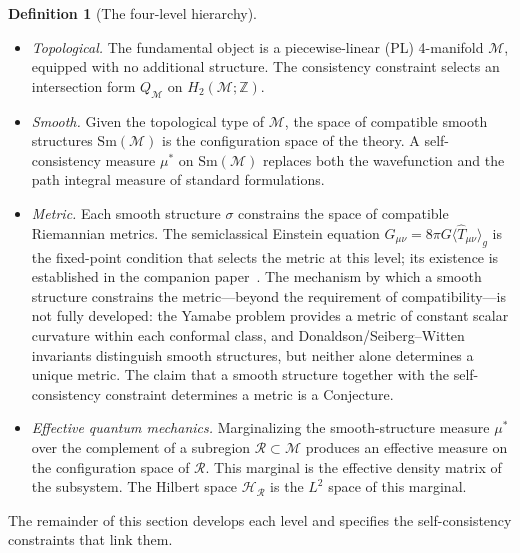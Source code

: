 \documentclass[12pt,a4paper]{article}
\theoremstyle{definition}
\newtheorem{definition}{Definition}
\theoremstyle{remark}
\begin{document}
\begin{definition}[The four-level hierarchy]
\label{def:hierarchy}
\quad
\begin{itemize}
\item[\emph{Level 0.}] \emph{Topological.} The fundamental object is a
piecewise-linear (PL) 4-manifold $\mathcal{M}$, equipped with no additional
structure. The consistency constraint selects an intersection form $Q_\mathcal{M}$
on $H_2(\mathcal{M};\mathbb{Z})$.

\item[\emph{Level 1.}] \emph{Smooth.} Given the topological type of
$\mathcal{M}$, the space of compatible smooth structures $\mathrm{Sm}(\mathcal{M})$
is the configuration space of the theory. A self-consistency measure $\mu^*$ on
$\mathrm{Sm}(\mathcal{M})$ replaces both the wavefunction and the path integral
measure of standard formulations.

\item[\emph{Level 2.}] \emph{Metric.} Each smooth structure $\sigma$ constrains
the space of compatible Riemannian metrics. The semiclassical Einstein equation
$G_{\mu\nu} = 8\pi G\langle\hat{T}_{\mu\nu}\rangle_g$ is the fixed-point
condition that selects the metric at this level; its existence is established in
the companion paper~\cite{fixed_point}. The mechanism by which a smooth
structure constrains the metric---beyond the requirement of compatibility---is
not fully developed: the Yamabe problem provides a metric of constant scalar
curvature within each conformal class, and Donaldson/Seiberg--Witten invariants
distinguish smooth structures, but neither alone determines a unique metric.
The claim that a smooth structure together with the self-consistency constraint
determines a metric is a Conjecture.

\item[\emph{Level 3.}] \emph{Effective quantum mechanics.} Marginalizing the
smooth-structure measure $\mu^*$ over the complement of a subregion
$\mathcal{R}\subset\mathcal{M}$ produces an effective measure on the
configuration space of $\mathcal{R}$. This marginal is the effective density
matrix of the subsystem. The Hilbert space $\mathcal{H}_\mathcal{R}$ is the
$L^2$ space of this marginal.
\end{itemize}
\end{definition}

The remainder of this section develops each level and specifies the
self-consistency constraints that link them.

\end{document}
